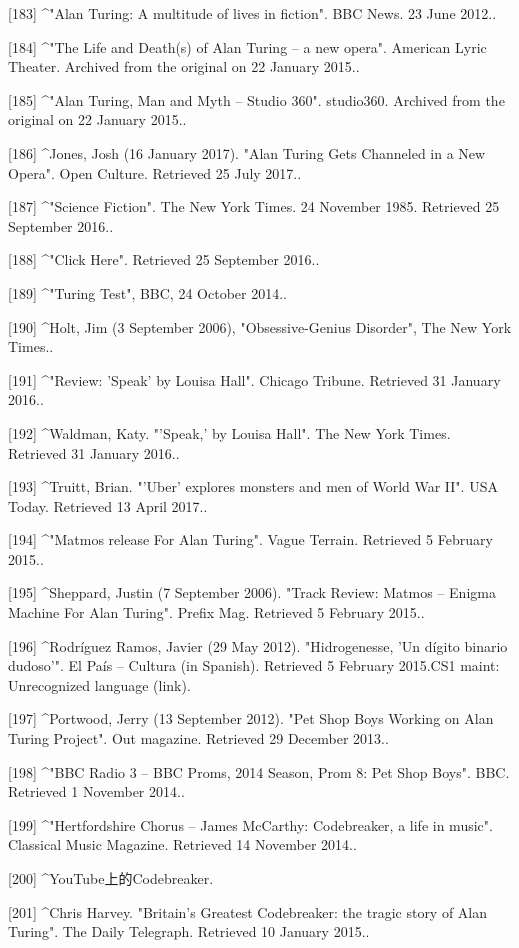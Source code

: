[183]
^"Alan Turing: A multitude of lives in fiction". BBC News. 23 June 2012..

[184]
^"The Life and Death(s) of Alan Turing – a new opera". American Lyric Theater. Archived from the original on 22 January 2015..

[185]
^"Alan Turing, Man and Myth – Studio 360". studio360. Archived from the original on 22 January 2015..

[186]
^Jones, Josh (16 January 2017). "Alan Turing Gets Channeled in a New Opera". Open Culture. Retrieved 25 July 2017..

[187]
^"Science Fiction". The New York Times. 24 November 1985. Retrieved 25 September 2016..

[188]
^"Click Here". Retrieved 25 September 2016..

[189]
^"Turing Test", BBC, 24 October 2014..

[190]
^Holt, Jim (3 September 2006), "Obsessive-Genius Disorder", The New York Times..

[191]
^"Review: 'Speak' by Louisa Hall". Chicago Tribune. Retrieved 31 January 2016..

[192]
^Waldman, Katy. "'Speak,' by Louisa Hall". The New York Times. Retrieved 31 January 2016..

[193]
^Truitt, Brian. "'Uber' explores monsters and men of World War II". USA Today. Retrieved 13 April 2017..

[194]
^"Matmos release For Alan Turing". Vague Terrain. Retrieved 5 February 2015..

[195]
^Sheppard, Justin (7 September 2006). "Track Review: Matmos – Enigma Machine For Alan Turing". Prefix Mag. Retrieved 5 February 2015..

[196]
^Rodríguez Ramos, Javier (29 May 2012). "Hidrogenesse, 'Un dígito binario dudoso'". El País – Cultura (in Spanish). Retrieved 5 February 2015.CS1 maint: Unrecognized language (link).

[197]
^Portwood, Jerry (13 September 2012). "Pet Shop Boys Working on Alan Turing Project". Out magazine. Retrieved 29 December 2013..

[198]
^"BBC Radio 3 – BBC Proms, 2014 Season, Prom 8: Pet Shop Boys". BBC. Retrieved 1 November 2014..

[199]
^"Hertfordshire Chorus – James McCarthy: Codebreaker, a life in music". Classical Music Magazine. Retrieved 14 November 2014..

[200]
^YouTube上的Codebreaker.

[201]
^Chris Harvey. "Britain's Greatest Codebreaker: the tragic story of Alan Turing". The Daily Telegraph. Retrieved 10 January 2015..

